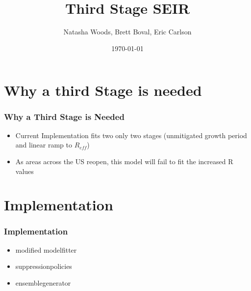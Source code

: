 \documentclass{beamer}
\title[Third Stage SEIR]{Third Stage SEIR} %
\author[Natasha Woods, Brett Boval, Eric Carlson]{Natasha Woods, Brett Boval, Eric Carlson} %
\date{\today} %
\begin{document}
\begin{frame}
\titlepage %
\end{frame}

\begin{frame}
\tableofcontents
\end{frame}



\section{Why a third Stage is needed} %
\begin{frame}
\frametitle{Why a Third Stage is Needed}
\begin{itemize}[label={-}]
\item Current Implementation fits two only two stages (unmitigated growth period and linear ramp to $R_{eff}$)
\item As areas across the US reopen, this model will fail to fit the increased R values

\end{itemize}
\end{frame}

\section{Implementation} %
\begin{frame}
\frametitle{Implementation}
\begin{itemize}[label={-}]
\item modified modelfitter
\item suppressionpolicies
\item ensemblegenerator

\end{itemize}
\end{frame}
\end{document}
